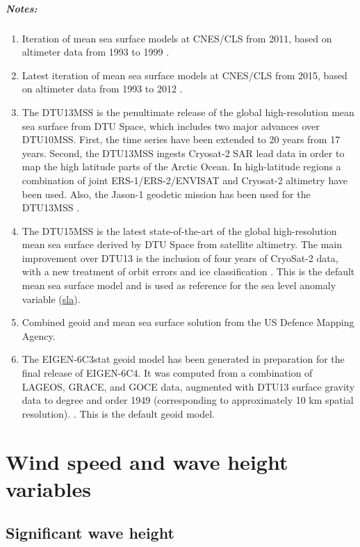 \documentclass[a4paper,11pt,openany,natbib,nomargin]{thesis}
\makeatletter
\newcommand\var[1]{\url{#1}\index{variables!#1@\protect\url{#1}}}
\newenvironment{notes}[1][Notes:]{\FloatBarrier\paragraph{#1}\begin{enumerate}}{\end{enumerate}}
\makeatother
\begin{document}
\begin{notes}
\item Iteration of mean sea surface models at CNES/CLS from 2011, based on altimeter data from 1993 to 1999 \citep{schaeffer2012}.\label{item:mss_cnescls11}
\item Latest iteration of mean sea surface models at CNES/CLS from 2015, based on altimeter data from 1993 to 2012 \citep{schaeffer2012}.\label{item:mss_cnescls15}
\item The DTU13MSS is the penultimate release of the global high-resolution mean sea surface from DTU Space, which includes two major advances over DTU10MSS. First, the time series have been extended to 20 years from 17 years. Second, the DTU13MSS ingests Cryosat-2 SAR lead data in order to map the high latitude parts of the Arctic Ocean. In high-latitude regions a combination of joint ERS-1/ERS-2/ENVISAT and Cryosat-2 altimetry have been used. Also, the Jason-1 geodetic mission has been used for the DTU13MSS \citep{andersen2013a}.\label{item:mss_dtu13}
\item The DTU15MSS is the latest state-of-the-art of the global high-resolution mean sea surface derived by DTU Space from satellite altimetry. The main improvement over DTU13 is the inclusion of four years of CryoSat-2 data, with a new treatment of orbit errors and ice classification \citep{stenseng2015}. This is the default mean sea surface model and is used as reference for the sea level anomaly variable (\var{sla}).\label{item:mss_dtu15}
\item Combined geoid and mean sea surface solution from the US Defence Mapping Agency\citep{pavlis2012}.
\label{item:geoid_egm2008}
\item The EIGEN-6C3stat geoid model has been generated in preparation for the final release of EIGEN-6C4. It was computed from a combination of LAGEOS, GRACE, and GOCE data, augmented with DTU13 surface gravity data to degree and order 1949 (corresponding to approximately 10 km spatial resolution). \citep{foerste2013,shako2014}. This is the default geoid model.\label{item:geoid_eigen6}
\end{notes}

\chapter{Wind speed and wave height variables}
\section{Significant wave height}
\label{var:swh}
\end{document}
